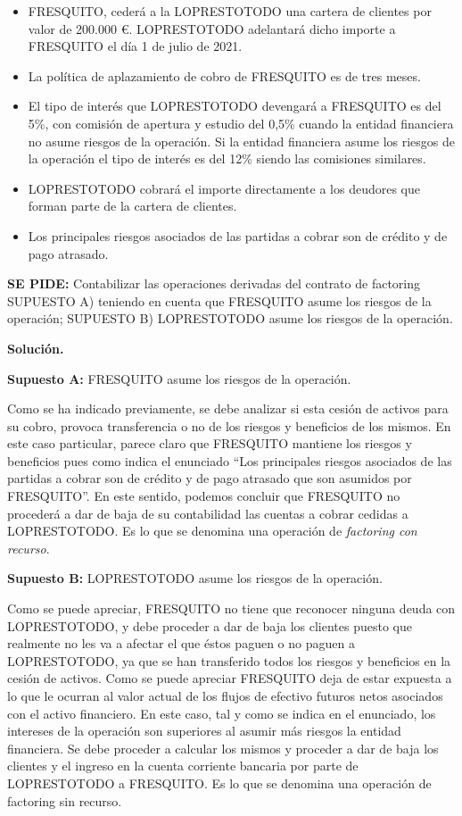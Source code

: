 \begin{itemize}
    \item FRESQUITO, cederá a la LOPRESTOTODO una cartera de clientes por valor de 200.000 €. LOPRESTOTODO adelantará dicho importe a FRESQUITO el día 1 de julio de 2021.
    \item La política de aplazamiento de cobro de FRESQUITO es de tres meses.
    \item El tipo de interés que LOPRESTOTODO devengará a FRESQUITO es del 5\%, con comisión de apertura y estudio del 0,5\% cuando la entidad financiera no asume riesgos de la operación. Si la entidad financiera asume los riesgos de la operación el tipo de interés es del 12\% siendo las comisiones similares.
    \item LOPRESTOTODO cobrará el importe directamente a los deudores que forman parte de la cartera de clientes.
    \item Los principales riesgos asociados de las partidas a cobrar son de crédito y de pago atrasado.
\end{itemize}

\textbf{SE PIDE:} Contabilizar las operaciones derivadas del contrato de factoring SUPUESTO A) teniendo en cuenta que FRESQUITO asume los riesgos de la operación; SUPUESTO B) LOPRESTOTODO asume los riesgos de la operación.

\textbf{Solución.}

\textbf{Supuesto A:} FRESQUITO asume los riesgos de la operación.

Como se ha indicado previamente, se debe analizar si esta cesión de activos para su cobro, provoca transferencia o no de los riesgos y beneficios de los mismos. En este caso particular, parece claro que FRESQUITO mantiene los riesgos y beneficios pues como indica el enunciado “Los principales riesgos asociados de las partidas a cobrar son de crédito y de pago atrasado que son asumidos por FRESQUITO”. En este sentido, podemos concluir que FRESQUITO no procederá a dar de baja de su contabilidad las cuentas a cobrar cedidas a LOPRESTOTODO. Es lo que se denomina una operación de \textit{factoring con recurso}.

\textbf{Supuesto B:} LOPRESTOTODO asume los riesgos de la operación.

Como se puede apreciar, FRESQUITO no tiene que reconocer ninguna deuda con LOPRESTOTODO, y debe proceder a dar de baja los clientes puesto que realmente no les va a afectar el que éstos paguen o no paguen a LOPRESTOTODO, ya que se han transferido todos los riesgos y beneficios en la cesión de activos. Como se puede apreciar FRESQUITO deja de estar expuesta a lo que le ocurran al valor actual de los flujos de efectivo futuros netos asociados con el activo financiero. En este caso, tal y como se indica en el enunciado, los intereses de la operación son superiores al asumir más riesgos la entidad financiera. Se debe proceder a calcular los mismos y proceder a dar de baja los clientes y el ingreso en la cuenta corriente bancaria por parte de LOPRESTOTODO a FRESQUITO. Es lo que se denomina una operación de factoring sin recurso.

